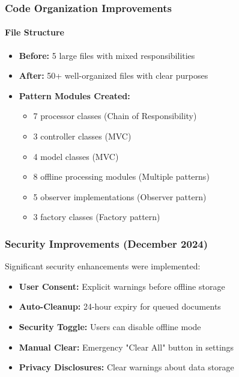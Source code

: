 \documentclass[11pt, a4paper]{article}
\theoremstyle{plain}
\theoremstyle{definition}
\begin{document}
\subsubsection{Code Organization Improvements}

\paragraph{File Structure}
\begin{itemize}
    \item \textbf{Before:} 5 large files with mixed responsibilities
    \item \textbf{After:} 50+ well-organized files with clear purposes
    \item \textbf{Pattern Modules Created:}
    \begin{itemize}
        \item 7 processor classes (Chain of Responsibility)
        \item 3 controller classes (MVC)
        \item 4 model classes (MVC)
        \item 8 offline processing modules (Multiple patterns)
        \item 5 observer implementations (Observer pattern)
        \item 3 factory classes (Factory pattern)
    \end{itemize}
\end{itemize}

\subsubsection{Security Improvements (December 2024)}

Significant security enhancements were implemented:

\begin{itemize}
    \item \textbf{User Consent:} Explicit warnings before offline storage
    \item \textbf{Auto-Cleanup:} 24-hour expiry for queued documents
    \item \textbf{Security Toggle:} Users can disable offline mode
    \item \textbf{Manual Clear:} Emergency "Clear All" button in settings
    \item \textbf{Privacy Disclosures:} Clear warnings about data storage
\end{itemize}
\end{document}
